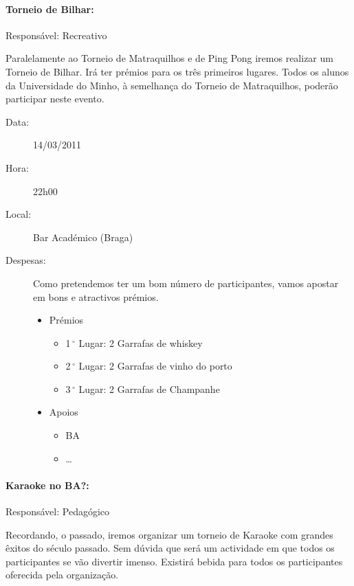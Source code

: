 \paragraph{Torneio de Bilhar:}
Responsável: Recreativo

Paralelamente ao Torneio de Matraquilhos e de Ping Pong iremos realizar um Torneio de Bilhar. Irá ter prémios para os três primeiros lugares. Todos os alunos da Universidade do Minho, à semelhança do Torneio de Matraquilhos, poderão participar neste evento.

\begin{description}
	\item[Data:] 14/03/2011
	\item[Hora:] 22h00
	\item[Local:] Bar Académico (Braga)
	\item[Despesas:] Como pretendemos ter um bom número de participantes, vamos apostar em bons e atractivos prémios.
	\begin{itemize}
		\item Prémios
		\begin{itemize}
			\item 1$\,^{\circ}$ Lugar: 2 Garrafas de whiskey
			\item 2$\,^{\circ}$ Lugar: 2 Garrafas de vinho do porto
			\item 3$\,^{\circ}$ Lugar: 2 Garrafas de Champanhe
		\end{itemize}
		\item Apoios
		\begin{itemize}
			\item BA
			\item \dots  
		\end{itemize}
	\end{itemize}
\end{description}



\paragraph{Karaoke no BA?:}
Responsável: Pedagógico

Recordando, o passado, iremos organizar um torneio de Karaoke com grandes êxitos do século passado. Sem dúvida que será um actividade em que todos os participantes se vão divertir imenso. Existirá bebida para todos os participantes oferecida pela organização.

